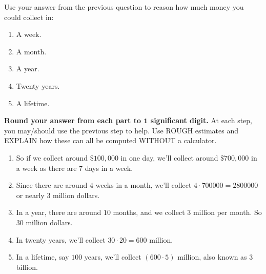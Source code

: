 \documentclass[nooutcomes,noauthor,hints,handout]{ximera}
\begin{document}
\begin{question}
  Use your answer from the previous question to reason how much money
  you could collect in:
  \begin{enumerate}
  \item A week.
  \item A month.
  \item A year.
  \item Twenty years.
  \item A lifetime.
  \end{enumerate}
  \textbf{Round your answer from each part to $\boldsymbol{1}$ significant digit.}
  At each step, you may/should use the previous step to help. Use
  ROUGH estimates and EXPLAIN how these can all be computed WITHOUT a
  calculator.
  \begin{freeResponse}
    \begin{enumerate}
      \item So if we collect around $\$100,000$ in one day, we'll
        collect around $\$700,000$ in a week as there are $7$ days in
        a week.
      \item Since there are around $4$ weeks in a month, we'll collect
        $4\cdot 700000 = 2800000$ or nearly $3$ million dollars.
      \item In a year, there are around $10$ months, and we collect
        $3$ million per month. So $30$ million dollars.
      \item In twenty years, we'll collect $30\cdot 20 = 600$ million.
      \item In a lifetime, say $100$ years, we'll collect $(600\cdot 5)$
        million, also known as $3$ billion.
    \end{enumerate}
  \end{freeResponse}
\end{question}
\mynewpage
\end{document}
